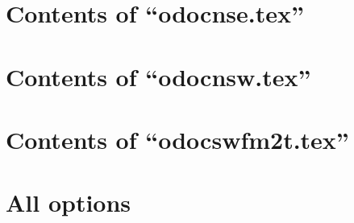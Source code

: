 \section{Contents of ``odocnse.tex''}

\begin{itemize}

\end{itemize}

\section{Contents of ``odocnsw.tex''}

\begin{itemize}

\end{itemize}

\section{Contents of ``odocswfm2t.tex''}

\begin{itemize}

\end{itemize}

\section{All options}

\begin{itemize}

\end{itemize}

